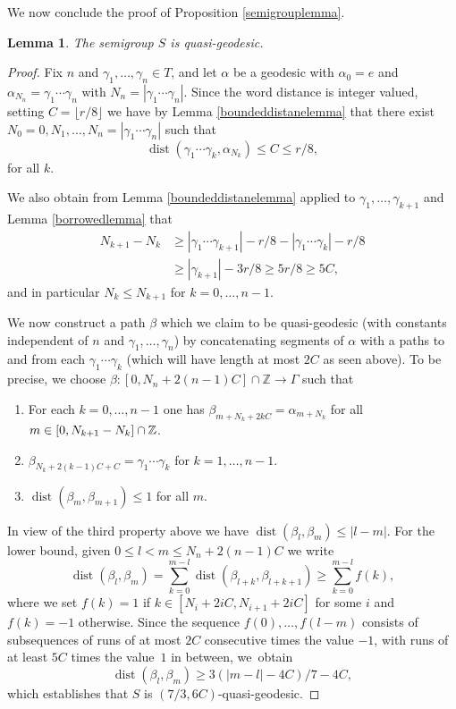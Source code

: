 \documentclass[10pt,a4paper]{amsart}
\newtheorem{lemma}[theorem]{Lemma}
\newcommand{\Z}{\mathbb{Z}}
\DeclareMathOperator{\dist}{dist}
\begin{document}
We now conclude the proof of Proposition \ref{semigrouplemma}.

\begin{lemma}
The semigroup \(S\) is quasi-geodesic.
\end{lemma}
\begin{proof}
Fix \(n\) and \(\gamma_1,\ldots, \gamma_n \in T\), and let \(\alpha\) be a geodesic with \(\alpha_0 = e\) and \(\alpha_{N_n} = \gamma_1\cdots \gamma_n\) with \(N_n = |\gamma_1\cdots \gamma_n|\).
Since the word distance is integer valued, setting \(C = \lfloor r/8 \rfloor\) we have by Lemma \ref{boundeddistanelemma} that there exist \(N_0 = 0, N_1, \ldots,N_n = |\gamma_1\cdots \gamma_n|\) such that\vspace*{-3pt}
\[
\dist(\gamma_1\cdots \gamma_k, \alpha_{N_k}) \le C \le r/8,
\]
for all \(k\).

We also obtain from Lemma \ref{boundeddistanelemma} applied to \(\gamma_1,\ldots, \gamma_{k+1}\) and Lemma \ref{borrowedlemma} that
\begin{align*}
N_{k+1} - N_k &\ge |\gamma_1\cdots \gamma_{k+1}|-r/8 - |\gamma_1\cdots \gamma_k| -r/8
\\ &\ge |\gamma_{k+1}| - 3r/8 \ge 5r/8 \ge 5C,
\end{align*}
and in particular \(N_{k} \le N_{k+1}\) for \(k = 0,\ldots, n-1\).

We now construct a path \(\beta\) which we claim to be quasi-geodesic (with constants independent of \(n\) and \(\gamma_1,\ldots,\gamma_n\)) by concatenating segments of \(\alpha\) with a paths to and from each \(\gamma_1\cdots \gamma_k\) (which will have length at most \(2C\) as seen above).
To be precise, we choose \(\beta:[0,N_n + 2(n-1)C] \cap \Z \to \Gamma\) such that
\begin{enumerate}
\item For each \(k = 0,\ldots,n-1\) one has \(\beta_{m+N_k+2kC} = \alpha_{m+N_k}\) for all \(m \in [0,N_{k+1}-\nobreak N_k] \cap \Z\).
\item \(\beta_{N_k + 2(k-1)C + C} = \gamma_1\cdots \gamma_k\) for \(k = 1,\ldots, n-1\).
\item \(\dist(\beta_m, \beta_{m+1})\le 1\) for all \(m\).
\end{enumerate}
In view of the third property above we have
\(\dist(\beta_l,\beta_m) \le |l-m|\).
For the lower bound, given \(0 \le l < m \le N_n + 2(n-1)C\) we write
\[
\dist(\beta_l,\beta_m) = \sum_{k = 0}^{m-l}\dist(\beta_{l+k},\beta_{l+k+1}) \ge \sum_{k = 0}^{m-l}f(k),
\]
where we set \(f(k) = 1\) if \(k \in [N_i+2iC,N_{i+1}+2iC]\) for some \(i\) and \(f(k) = -1\) otherwise.
Since the sequence \(f(0),\ldots,f(l-m)\) consists of subsequences of runs of at most \(2C\) consecutive times the value \(-1\), with runs of at least \(5C\) times the value~\(1\) in between, we~obtain
\[
\dist(\beta_l,\beta_m) \ge 3(|m-l| - 4C)/7 - 4C,
\]
which establishes that \(S\) is \((7/3, 6C)\)-quasi-geodesic.
\end{proof}
\end{document}
